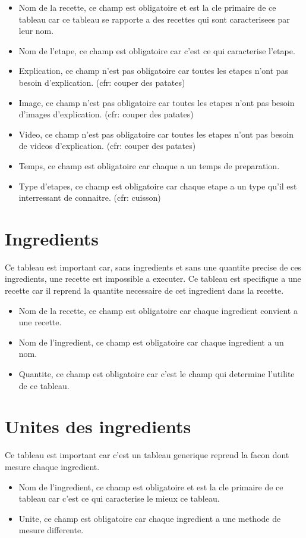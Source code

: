 \documentclass[a4paper,10pt]{report}
\begin{document}
\begin{itemize}
	\item Nom de la recette,  ce champ est obligatoire et est la cle primaire de ce tableau car ce tableau se rapporte a des recettes qui sont caracterisees par leur nom.
	\item Nom de l'etape,  ce champ est obligatoire car c'est ce qui caracterise l'etape.
	\item Explication, ce champ n'est pas obligatoire car toutes les etapes n'ont pas besoin d'explication. (cfr: couper des patates)
	\item Image, ce champ n'est pas obligatoire car toutes les etapes n'ont pas besoin d'images d'explication. (cfr: couper des patates)
	\item Video, ce champ n'est pas obligatoire car toutes les etapes n'ont pas besoin de videos d'explication. (cfr: couper des patates)
	\item Temps, ce champ est obligatoire car chaque a un temps de preparation.
	\item Type d'etapes, ce champ est obligatoire car chaque etape a un type qu'il est interressant de connaitre. (cfr: cuisson) 
\end{itemize}

\section{Ingredients}

Ce tableau est important car, sans ingredients et sans une quantite precise de ces ingredients, une recette est impossible a executer. Ce tableau est specifique a une recette car il reprend la quantite necessaire de cet ingredient dans la recette.

\begin{itemize}
	\item Nom de la recette, ce champ est obligatoire car chaque ingredient convient a une recette.
	\item Nom de l'ingredient, ce champ est obligatoire car chaque ingredient a un nom.
	\item Quantite, ce champ est obligatoire car c'est le champ qui determine l'utilite de ce tableau.
\end{itemize}

\section{Unites des ingredients}

Ce tableau est important car c'est un tableau generique reprend la facon dont mesure chaque ingredient.

\begin{itemize}
	\item Nom de l'ingredient, ce champ est obligatoire et est la cle primaire de ce tableau car c'est ce qui caracterise le mieux ce tableau.
	\item Unite, ce champ est obligatoire car chaque ingredient a une methode de mesure differente.
\end{itemize}
\end{document}
